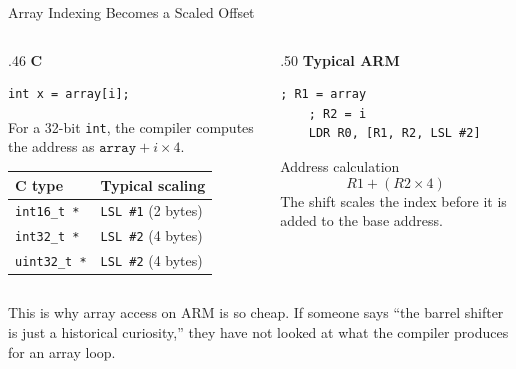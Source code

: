 \documentclass[9pt,aspectratio=169,xcolor=table]{beamer}
\begin{document}
\begin{frame}[fragile]{Array Indexing Becomes a Scaled Offset}
	\begin{columns}[T]
		\begin{column}{.46\textwidth}
			\textbf{C}

			\begin{lstlisting}[style=myc]
	int x = array[i];
			\end{lstlisting}

			\vspace{2mm}
			{\small
				For a 32-bit \texttt{int}, the compiler computes the
				address as $\texttt{array} + i \times 4$.
			}

			\vspace{5mm}
		{\small
	\begin{tabular}{@{}l l@{}}
		\toprule
		\textbf{C type} & \textbf{Typical scaling} \\
		\midrule
		\texttt{int16\_t *} & \texttt{LSL \#1} \quad (2 bytes) \\
		\texttt{int32\_t *} & \texttt{LSL \#2} \quad (4 bytes) \\
		\texttt{uint32\_t *} & \texttt{LSL \#2} \quad (4 bytes) \\
		\bottomrule
\end{tabular}}
		\end{column}

		\begin{column}{.50\textwidth}
			\textbf{Typical ARM}

			\begin{lstlisting}[style=armasm, language=ARM]
	; R1 = array
	; R2 = i
	LDR R0, [R1, R2, LSL #2]
			\end{lstlisting}
			\vspace{2mm}
			\begin{block}{Address calculation}
				\[
				R1 + (R2 \times 4)
				\]
				The shift scales the index before it is added to the
				base address.
			\end{block}
		\end{column}
	\end{columns}

	\vspace{3mm}

	\begin{center}
	\end{center}
	\vspace{2mm}

This is why array access on ARM is so cheap.
{\small If someone says ``the barrel shifter is just a historical    curiosity,'' they have not looked at what the compiler produces for    an array loop.}



\end{frame}
\end{document}
